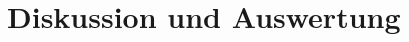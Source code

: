 \documentclass[main.tex]{subfiles}
\begin{document}
\section{Diskussion und Auswertung}
\end{document}
